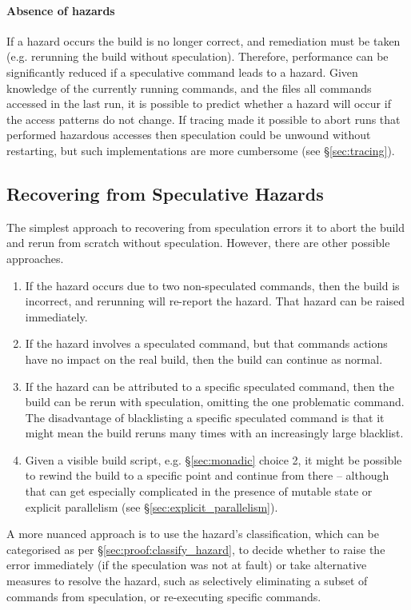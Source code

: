 \paragraph{Absence of hazards} If a hazard occurs the build is no longer correct, and remediation must be taken (e.g. rerunning the build without speculation). Therefore, performance can be significantly reduced if a speculative command leads to a hazard. Given knowledge of the currently running commands, and the files all commands accessed in the last run, it is possible to predict whether a hazard will occur if the access patterns do not change. If tracing made it possible to abort runs that performed hazardous accesses then speculation could be unwound without restarting, but such implementations are more cumbersome (see \S\ref{sec:tracing}).

\subsection{Recovering from Speculative Hazards}

The simplest approach to recovering from speculation errors it to abort the build and rerun from scratch without speculation. However, there are other possible approaches.

\begin{enumerate}
\item If the hazard occurs due to two non-speculated commands, then the build is incorrect, and rerunning will re-report the hazard. That hazard can be raised immediately.
\item If the hazard involves a speculated command, but that commands actions have no impact on the real build, then the build can continue as normal.
\item If the hazard can be attributed to a specific speculated command, then the build can be rerun with speculation, omitting the one problematic command. The disadvantage of blacklisting a specific speculated command is that it might mean the build reruns many times with an increasingly large blacklist.
\item Given a visible build script, e.g. \S\ref{sec:monadic} choice 2, it might be possible to rewind the build to a specific point and continue from there -- although that can get especially complicated in the presence of mutable state or explicit parallelism (see \S\ref{sec:explicit_parallelism}).
\end{enumerate}

A more nuanced approach is to use the hazard's classification, which can be categorised as per \S\ref{sec:proof:classify_hazard}, to decide whether to raise the error immediately (if the speculation was not at fault) or take alternative measures to resolve the hazard, such as selectively eliminating a subset of commands from speculation, or re-executing specific commands.


